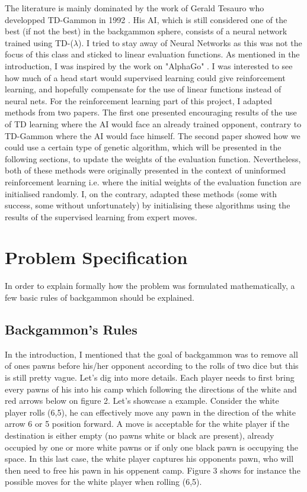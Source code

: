 \documentclass[11pt]{article}
\begin{document}
The literature is mainly dominated by the work of Gerald Tesauro who developped TD-Gammon in 1992 \cite{tdg}. His AI, which is still considered one of the best (if not the best) in the backgammon sphere, consists of a neural network trained using TD-($\lambda$). I tried to stay away of Neural Networks as this was not the focus of this class and sticked to linear evaluation functions. As mentioned in the introduction, I was inspired by the work on "AlphaGo" \cite{alpha}. I was interested to see how much of a head start would supervised learning could give reinforcement learning, and hopefully compensate for the use of linear functions instead of neural nets. For the reinforcement learning part of this project, I adapted methods from two papers. The first one \cite{expert} presented encouraging results of the use of TD learning where the AI would face an already trained opponent, contrary to TD-Gammon where the AI would face himself. The second paper \cite{genetic} showed how we could use a certain type of genetic algorithm, which will be presented in the following sections, to update the weights of the evaluation function. Nevertheless, both of these methods were originally presented in the context of uninformed reinforcement learning i.e. where the initial weights of the evaluation function are initialised randomly. I, on the contrary, adapted these methods (some with success, some without unfortunately) by initialising these algorithms using the results of the supervised learning from expert moves. 
 

\section{Problem Specification}
In order to explain formally how the problem was formulated mathematically, a few basic rules of backgammon should be explained.
\subsection{Backgammon's Rules}
In the introduction, I mentioned that the goal of backgammon was to remove all of ones pawns before his/her opponent according to the rolls of two dice but this is still pretty vague. Let's dig into more details. Each player needs to first bring every pawns of his into his camp which following the directions of the white and red arrows below on figure 2. Let's showcase a example. Consider the white player rolls (6,5), he can effectively move any pawn in the direction of the white arrow 6 or 5 position forward. A move is acceptable for the white player if the destination is either empty (no pawns white or black are present), already occupied by one or more white pawns or if only one black pawn is occupying the space. In this last case, the white player captures his opponents pawn, who will then need to free his pawn in his oppenent camp. Figure 3 shows for instance the possible moves for the white player when rolling (6,5).\\
\end{document}
